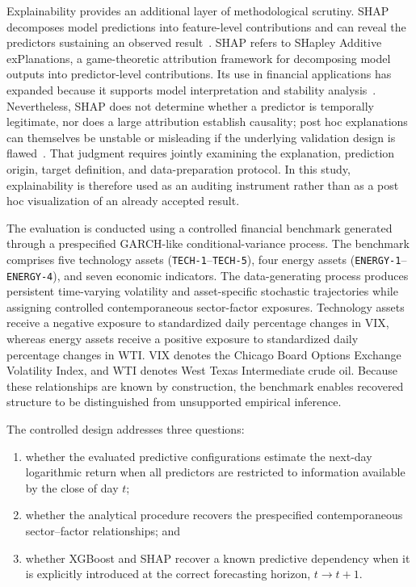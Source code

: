 \documentclass[utf8]{FrontiersinHarvard} %
\newcommand{\rev}[1]{{\color{red}#1}}
\begin{document}
Explainability provides an additional layer of methodological scrutiny. SHAP decomposes model predictions into feature-level contributions and can reveal the predictors sustaining an observed result~\citep{Lundberg2017shap}. \rev{SHAP refers to SHapley Additive exPlanations, a game-theoretic attribution framework for decomposing model outputs into predictor-level contributions.} Its use in financial applications has expanded because it supports model interpretation and stability analysis~\citep{Wang2025shap,Chan2026financial}. Nevertheless, SHAP does not determine whether a predictor is temporally legitimate, nor does a large attribution establish causality; post hoc explanations can themselves be unstable or misleading if the underlying validation design is flawed~\citep{Slack2020}. That judgment requires jointly examining the explanation, prediction origin, target definition, and data-preparation protocol. In this study, explainability is therefore used as an auditing instrument rather than as a post hoc visualization of an already accepted result.

The evaluation is conducted using a controlled financial benchmark generated through a prespecified GARCH-like conditional-variance process. The benchmark comprises five technology assets (\texttt{TECH-1}--\texttt{TECH-5}), four energy assets (\texttt{ENERGY-1}--\texttt{ENERGY-4}), and seven economic indicators. The data-generating process produces persistent time-varying volatility and asset-specific stochastic trajectories while assigning controlled contemporaneous sector-factor exposures. Technology assets receive a negative exposure to standardized daily percentage changes in VIX, whereas energy assets receive a positive exposure to standardized daily percentage changes in WTI. \rev{VIX denotes the Chicago Board Options Exchange Volatility Index, and WTI denotes West Texas Intermediate crude oil.} Because these relationships are known by construction, the benchmark enables recovered structure to be distinguished from unsupported empirical inference.

The controlled design addresses three questions:

\begin{enumerate}
	\item whether the evaluated predictive configurations estimate the next-day logarithmic return when all predictors are restricted to information available by the close of day \(t\);
	\item whether the analytical procedure recovers the prespecified contemporaneous sector--factor relationships; and
	\item whether XGBoost and SHAP recover a known predictive dependency when it is explicitly introduced at the correct forecasting horizon, \(t\rightarrow t+1\).
\end{enumerate}
\end{document}
